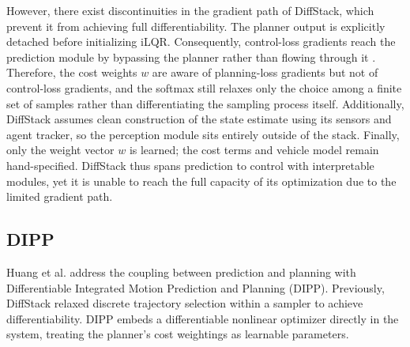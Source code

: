 However, there exist discontinuities in the gradient path of DiffStack, which prevent it from achieving full differentiability.
The planner output is explicitly detached before initializing iLQR. 
Consequently, control-loss gradients reach the prediction module by bypassing the planner rather than flowing through it \cite{karkus_DiffStackDifferentiableModular_2022}.
Therefore, the cost weights $w$ are aware of planning-loss gradients but not of control-loss gradients, and the softmax still relaxes only the choice among a finite set of samples rather than differentiating the sampling process itself.
Additionally, DiffStack assumes clean construction of the state estimate using its sensors and agent tracker, so the perception module sits entirely outside of the stack.
Finally, only the weight vector $w$ is learned; the cost terms and vehicle model remain hand-specified.
DiffStack thus spans prediction to control with interpretable modules, yet it is unable to reach the full capacity of its optimization due to the limited gradient path.

\subsection{DIPP}
\label{subsection:DIPP}

Huang et al. \cite{huang_DifferentiableIntegratedMotion_2024} address the coupling between prediction and planning with Differentiable Integrated Motion Prediction and Planning (DIPP).
Previously, DiffStack relaxed discrete trajectory selection within a sampler to achieve differentiability.
DIPP embeds a differentiable nonlinear optimizer directly in the system, treating the planner's cost weightings as learnable parameters.

